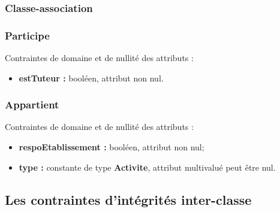 %
%

\subsubsection{Classe-association}

\subsubsection*{Participe}
Contraintes de domaine et de nullité des attributs :
\begin{itemize}
	\item \textbf{estTuteur :} booléen, attribut non nul.\\
\end{itemize}

\subsubsection*{Appartient}
Contraintes de domaine et de nullité des attributs :
\begin{itemize}
	\item \textbf{respoEtablissement :} booléen, attribut non nul;
	\item \textbf{type :} constante de type \textbf{Activite}, attribut multivalué peut être nul.
\end{itemize}


\subsection{Les contraintes d'intégrités inter-classe}


